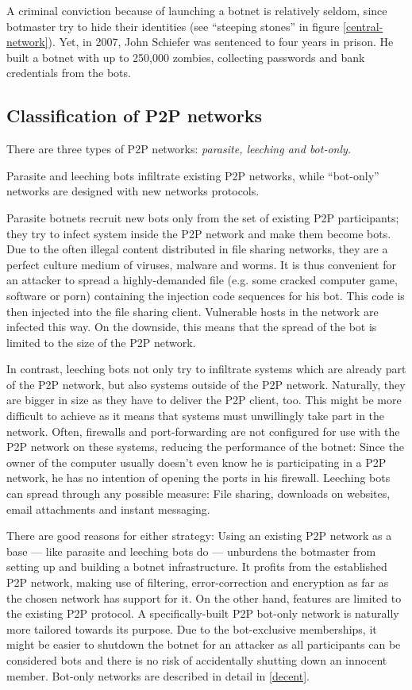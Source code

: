 \documentclass{llncs}
\begin{document}
 A criminal conviction because of launching a botnet is relatively
 seldom, since botmaster try to hide their identities (see ``steeping
 stones'' in figure \ref{central-network}). Yet, in 2007, John
 Schiefer was sentenced to four years in prison. He built a botnet
 with up to 250,000 zombies, collecting passwords and bank credentials
 from the bots.\cite{BotnetCrime}


\subsection{Classification of P2P networks}
\label{ClassificP2P}
There are three types of P2P networks: {\it parasite, leeching and
bot-only.}\cite{wang2009systematic} 

Parasite and leeching bots infiltrate existing P2P networks, while
``bot-only'' networks are designed with new networks protocols. 

Parasite botnets recruit new bots only from the set of existing P2P
participants; they try to infect system inside the P2P network and
make them become bots. Due to the often illegal content distributed in
file sharing networks, they are a perfect culture medium of viruses,
malware and worms. It is thus convenient for an attacker to spread a
highly-demanded file (e.g. some cracked computer game, software or
porn) containing the injection code sequences for his bot. This code is
then injected into the file sharing client. Vulnerable hosts in the
network are infected this way. On the downside, this means that the
spread of the bot is limited to the size of the P2P network.

In contrast, leeching bots not only try to infiltrate systems which
are already part of the P2P network, but also systems outside of the
P2P network. Naturally, they are bigger in size as they have to
deliver the P2P client, too. This might be more difficult to achieve
as it means that systems must unwillingly take part in the
network. Often, firewalls and port-forwarding are not configured for
use with the P2P network on these systems, reducing the performance of
the botnet: Since the owner of the computer usually doesn't even know
he is participating in a P2P network, he has no intention of opening
the ports in his firewall. Leeching bots can spread through any
possible measure: File sharing, downloads on websites, email
attachments and instant messaging.

There are good reasons for either strategy: Using an existing P2P
network as a base --- like parasite and leeching bots do --- unburdens
the botmaster from setting up and building a botnet infrastructure. It
profits from the established P2P network, making use of filtering,
error-correction and encryption as far as the chosen network has
support for it. On the other hand, features are limited to the
existing P2P protocol. A specifically-built P2P bot-only network is
naturally more tailored towards its purpose. Due to the bot-exclusive
memberships, it might be easier to shutdown the botnet for an attacker
as all participants can be considered bots and there is no risk of
accidentally shutting down an innocent member. Bot-only networks are
described in detail in \ref{decent}.
\end{document}
